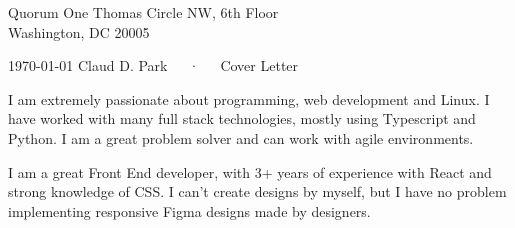 


\recipient
  {Quorum}
  {One Thomas Circle NW, 6th Floor\\
  Washington, DC 20005 }




\makecvheader[R]

\makecvfooter
  {\today}
  {Claud D. Park~~~·~~~Cover Letter}
  {}

\makelettertitle

\begin{cvletter}

I am extremely passionate about programming, web development
and Linux.
I have worked with many full stack technologies, mostly using
Typescript and Python.
I am a great problem solver and can work with agile
environments.

I am a great Front End developer, with 3+ years of experience with React and strong knowledge of CSS.
I can't create designs by myself, but I have no problem implementing responsive Figma designs made by designers.


\end{cvletter}


\makeletterclosing


